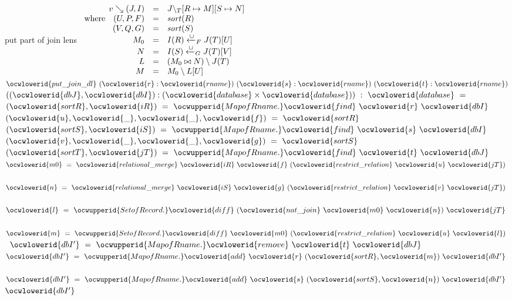 \documentclass[12pt]{article}
\begin{document}
\ocwendcode{}\ocwindent{0.00em}
put part of join lens 
\ocweol
\ocwindent{0.00em}
$
  \begin{array}{rcl}
  v\searrow(J,I)       &=& J{\setminus_T}[R\mapsto M][S\mapsto N]\\
  \text{where}\quad (U,P,F) &=& \mathit{sort}(R)                  \\
                    (V,Q,G) &=& \mathit{sort}(S)                  \\
                       M_0  &=& I(R)\xleftarrow{\cup}_{F}J(T)[U]\\
                         N  &=& I(S)\xleftarrow{\cup}_{G}J(T)[V]\\
                         L  &=& (M_0 \bowtie N) \setminus J(T)\\
                         M  &=& M_0 \setminus L[U]
  \end{array}
$ 
\ocweol
\label{rellens.ml:23545}%
\medskip
\ocwbegincode{}\ocwindent{0.00em}
~$\ocwlowerid{put\_join\_dl}~(\ocwlowerid{r}:\ocwlowerid{rname})~(\ocwlowerid{s}:\ocwlowerid{rname})~(\ocwlowerid{t}:\ocwlowerid{rname})$\ocweol
\ocwindent{2.00em}
$((\ocwlowerid{dbJ},\ocwlowerid{dbI}):(\ocwlowerid{database}\times{}\ocwlowerid{database}))~:~\ocwlowerid{database}~=$\ocweol
\ocwindent{1.00em}
~$(\ocwlowerid{sortR},\ocwlowerid{iR})~=~\ocwupperid{MapofRname.}\ocwlowerid{find}~\ocwlowerid{r}~\ocwlowerid{dbI}~$\ocweol
\ocwindent{1.00em}
~$(\ocwlowerid{u},\ocwlowerid{\_},\ocwlowerid{\_},\ocwlowerid{f})~=~\ocwlowerid{sortR}~$\ocweol
\ocwindent{1.00em}
~$(\ocwlowerid{sortS},\ocwlowerid{iS})~=~\ocwupperid{MapofRname.}\ocwlowerid{find}~\ocwlowerid{s}~\ocwlowerid{dbI}~$\ocweol
\ocwindent{1.00em}
~$(\ocwlowerid{v},\ocwlowerid{\_},\ocwlowerid{\_},\ocwlowerid{g})~=~\ocwlowerid{sortS}~$\ocweol
\ocwindent{1.00em}
~$(\ocwlowerid{sortT},\ocwlowerid{jT})~=~\ocwupperid{MapofRname.}\ocwlowerid{find}~\ocwlowerid{t}~\ocwlowerid{dbJ}~$\ocweol
\ocwindent{1.00em}
~$\ocwlowerid{m0}~=~\ocwlowerid{relational\_merge}~\ocwlowerid{iR}~\ocwlowerid{f}~(\ocwlowerid{restrict\_relation}~\ocwlowerid{u}~\ocwlowerid{jT})~$\ocweol
\ocwindent{1.00em}
~$\ocwlowerid{n}~=~\ocwlowerid{relational\_merge}~\ocwlowerid{iS}~\ocwlowerid{g}~(\ocwlowerid{restrict\_relation}~\ocwlowerid{v}~\ocwlowerid{jT})~$\ocweol
\ocwindent{1.00em}
~$\ocwlowerid{l}~=~\ocwupperid{SetofRecord.}\ocwlowerid{diff}~(\ocwlowerid{nat\_join}~\ocwlowerid{m0}~\ocwlowerid{n})~\ocwlowerid{jT}~$\ocweol
\ocwindent{1.00em}
~$\ocwlowerid{m}~=~\ocwupperid{SetofRecord.}\ocwlowerid{diff}~\ocwlowerid{m0}~(\ocwlowerid{restrict\_relation}~\ocwlowerid{u}~\ocwlowerid{l})~$\ocweol
\ocwindent{1.00em}
~$\ocwlowerid{dbI'}~=~\ocwupperid{MapofRname.}\ocwlowerid{remove}~\ocwlowerid{t}~\ocwlowerid{dbJ}~$\ocweol
\ocwindent{1.00em}
~$\ocwlowerid{dbI'}~=~\ocwupperid{MapofRname.}\ocwlowerid{add}~\ocwlowerid{r}~(\ocwlowerid{sortR},\ocwlowerid{m})~\ocwlowerid{dbI'}~$\ocweol
\ocwindent{1.00em}
~$\ocwlowerid{dbI'}~=~\ocwupperid{MapofRname.}\ocwlowerid{add}~\ocwlowerid{s}~(\ocwlowerid{sortS},\ocwlowerid{n})~\ocwlowerid{dbI'}~$\ocweol
\ocwindent{1.00em}
$\ocwlowerid{dbI'}$\medskip
\end{document}
